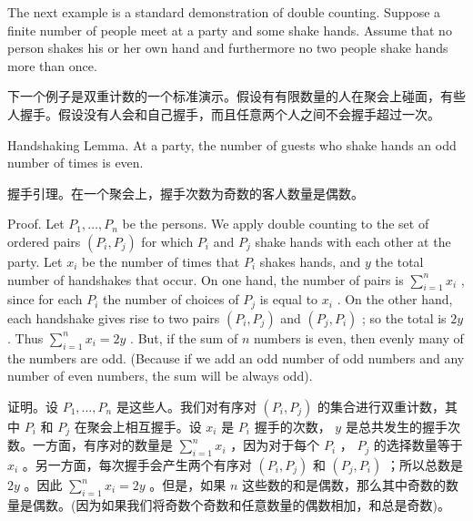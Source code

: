 \documentclass[10pt]{article}
\begin{document}
The next example is a standard demonstration of double counting. Suppose a finite number of people meet at a party and some shake hands. Assume that no person shakes his or her own hand and furthermore no two people shake hands more than once.

\begin{tcolorbox}\relax
下一个例子是双重计数的一个标准演示。假设有有限数量的人在聚会上碰面，有些人握手。假设没有人会和自己握手，而且任意两个人之间不会握手超过一次。
\end{tcolorbox}

Handshaking Lemma. At a party, the number of guests who shake hands an odd number of times is even.

\begin{tcolorbox}\relax
握手引理。在一个聚会上，握手次数为奇数的客人数量是偶数。
\end{tcolorbox}

Proof. Let \({P}_{1},\ldots ,{P}_{n}\) be the persons. We apply double counting to the set of ordered pairs \(\left( {{P}_{i},{P}_{j}}\right)\) for which \({P}_{i}\) and \({P}_{j}\) shake hands with each other at the party. Let \({x}_{i}\) be the number of times that \({P}_{i}\) shakes hands, and \(y\) the total number of handshakes that occur. On one hand, the number of pairs is \(\mathop{\sum }\limits_{{i = 1}}^{n}{x}_{i}\) , since for each \({P}_{i}\) the number of choices of \({P}_{j}\) is equal to \({x}_{i}\) . On the other hand, each handshake gives rise to two pairs \(\left( {{P}_{i},{P}_{j}}\right)\) and \(\left( {{P}_{j},{P}_{i}}\right)\) ; so the total is \({2y}\) . Thus \(\mathop{\sum }\limits_{{i = 1}}^{n}{x}_{i} = {2y}\) . But, if the sum of \(n\) numbers is even, then evenly many of the numbers are odd. (Because if we add an odd number of odd numbers and any number of even numbers, the sum will be always odd).

\begin{tcolorbox}\relax
证明。设 \({P}_{1},\ldots ,{P}_{n}\) 是这些人。我们对有序对 \(\left( {{P}_{i},{P}_{j}}\right)\) 的集合进行双重计数，其中 \({P}_{i}\) 和 \({P}_{j}\) 在聚会上相互握手。设 \({x}_{i}\) 是 \({P}_{i}\) 握手的次数， \(y\) 是总共发生的握手次数。一方面，有序对的数量是 \(\mathop{\sum }\limits_{{i = 1}}^{n}{x}_{i}\) ，因为对于每个 \({P}_{i}\) ， \({P}_{j}\) 的选择数量等于 \({x}_{i}\) 。另一方面，每次握手会产生两个有序对 \(\left( {{P}_{i},{P}_{j}}\right)\) 和 \(\left( {{P}_{j},{P}_{i}}\right)\) ；所以总数是 \({2y}\) 。因此 \(\mathop{\sum }\limits_{{i = 1}}^{n}{x}_{i} = {2y}\) 。但是，如果 \(n\) 这些数的和是偶数，那么其中奇数的数量是偶数。(因为如果我们将奇数个奇数和任意数量的偶数相加，和总是奇数)。
\end{tcolorbox}
\end{document}
